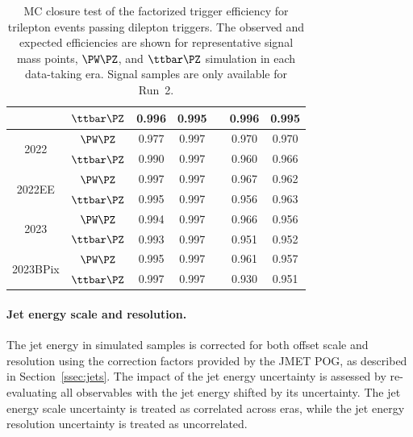 \begin{table}[htbp]
\begin{tabular}{ccccccc}
                                 & $\ttbar\PZ$                   & 0.996 & 0.995 & & 0.996 & 0.995 \\
    \hline
    \multirow{2}{*}{2022}        & $\PW\PZ$                      & 0.977 & 0.997 & & 0.970 & 0.970 \\
                                 & $\ttbar\PZ$                   & 0.990 & 0.997 & & 0.960 & 0.966 \\
    \hline
    \multirow{2}{*}{2022EE}      & $\PW\PZ$                      & 0.997 & 0.997 & & 0.967 & 0.962 \\
                                 & $\ttbar\PZ$                   & 0.995 & 0.997 & & 0.956 & 0.963 \\
    \hline
    \multirow{2}{*}{2023}        & $\PW\PZ$                      & 0.994 & 0.997 & & 0.966 & 0.956 \\
                                 & $\ttbar\PZ$                   & 0.993 & 0.997 & & 0.951 & 0.952 \\
    \hline
    \multirow{2}{*}{2023BPix}    & $\PW\PZ$                      & 0.995 & 0.997 & & 0.961 & 0.957 \\
                                 & $\ttbar\PZ$                   & 0.997 & 0.997 & & 0.930 & 0.951 \\
    \hline
  \end{tabular}
  \caption{MC closure test of the factorized trigger efficiency for trilepton events passing dilepton triggers. The observed and expected efficiencies are shown for representative signal mass points, $\PW\PZ$, and $\ttbar\PZ$ simulation in each data-taking era. Signal samples are only available for Run~2.}
  \label{tab:trig_closure_trilep}
\end{table}

\paragraph{Jet energy scale and resolution.}
The jet energy in simulated samples is corrected for both offset scale and resolution using the correction factors provided by the JMET POG, as described in Section~\ref{ssec:jets}. The impact of the jet energy uncertainty is assessed by re-evaluating all observables with the jet energy shifted by its uncertainty. The jet energy scale uncertainty is treated as correlated across eras, while the jet energy resolution uncertainty is treated as uncorrelated.

